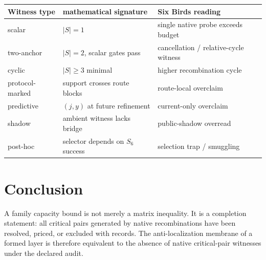 \documentclass[11pt]{article}
\begin{document}
\begin{center}
\begin{tabular}{lll}
\toprule
Witness type & mathematical signature & Six Birds reading\\
\midrule
scalar & $|S|=1$ & single native probe exceeds budget\\
two-anchor & $|S|=2$, scalar gates pass & cancellation / relative-cycle witness\\
cyclic & $|S|\ge3$ minimal & higher recombination cycle\\
protocol-marked & support crosses route blocks & route-local overclaim\\
predictive & $(j,y)$ at future refinement & current-only overclaim\\
shadow & ambient witness lacks bridge & public-shadow overread\\
post-hoc & selector depends on $S_6$ success & selection trap / smuggling\\
\bottomrule
\end{tabular}
\end{center}

\section*{Conclusion}
A family capacity bound is not merely a matrix inequality.  It is a completion statement: all critical pairs generated by native recombinations have been resolved, priced, or excluded with records.  The anti-localization membrane of a formed layer is therefore equivalent to the absence of native critical-pair witnesses under the declared audit.
\end{document}
